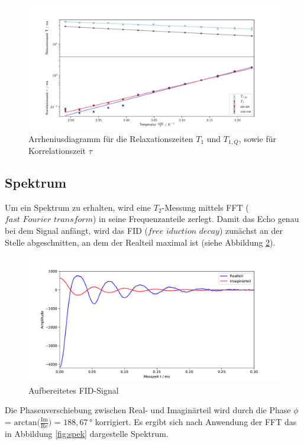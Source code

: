 \begin{figure}[H]
    \centering
    \includegraphics[width=\textwidth]{Auswertung/Tempabh/Korr_Temp.pdf}
    \caption{Arrheniusdiagramm für die Relaxationszeiten $T_1$ und $T_{1,Q}$, sowie
    für Korrelationszeit $\tau$}
    \label{fig:tempabh}
\end{figure}

\subsection{Spektrum}
\label{sec:spek}
Um ein Spektrum zu erhalten, wird eine $T_2$-Messung mittels FFT
($\textit{fast Fourier transform}$) in seine Frequenzanteile zerlegt.
Damit das Echo genau bei dem Signal anfängt, wird das FID
($\textit{free iduction decay}$) zunächst an der Stelle abgeschnitten, an dem der
Realteil maximal ist (siehe Abbildung \ref{fig:fid}).

\begin{figure}[H]
    \centering
    \includegraphics[width=\textwidth]{Auswertung/Spek/FID.pdf}
    \caption{Aufbereitetes FID-Signal}
    \label{fig:fid}
\end{figure}
\noindent
Die Phasenverschiebung zwischen Real- und Imaginärteil wird durch die Phase $\phi$ =
$\text{arctan}\biggl(\frac{\text{Im}}{\text{Re}}\biggr)$ = $188,67\,°$ korrigiert.
Es ergibt sich nach Anwendung der FFT das in Abbildung \ref{fig:spek} dargestelle
Spektrum.

